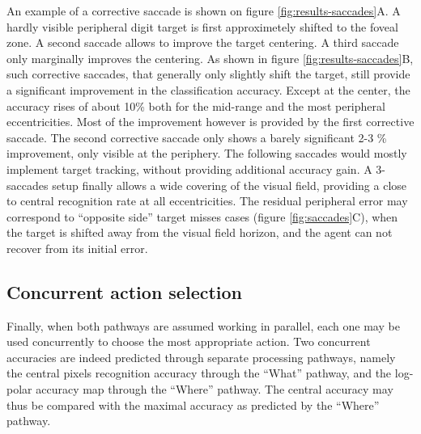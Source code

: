 An example of a corrective saccade is shown on figure \ref{fig:results-saccades}A. A hardly visible peripheral digit target is first approximetely shifted to the foveal zone. A second saccade allows to improve the target centering. A third saccade only marginally improves the centering.
As shown in figure  \ref{fig:results-saccades}B, such corrective saccades, that generally only slightly shift the target, still provide a significant improvement in the classification accuracy. Except at the center, the accuracy rises of about 10\% both for the mid-range and the most peripheral eccentricities. Most of the improvement however is provided by the first corrective saccade. The second corrective saccade only shows a barely significant 2-3 \% improvement, only visible at the periphery. The following saccades would mostly implement target tracking, without providing additional accuracy gain. A 3-saccades setup finally allows a wide covering of the visual field, providing a close to central  recognition rate at all eccentricities. The residual peripheral error may correspond to ``opposite side'' target misses cases (figure \ref{fig:saccades}C), when the target is shifted away from the visual field horizon, and the agent can not recover from its initial error.

\subsection{Concurrent action selection}



Finally, when both pathways are assumed working in parallel, each one may be used concurrently to choose the most appropriate action. Two concurrent accuracies are indeed  predicted through separate processing pathways, namely the central pixels recognition accuracy through the ``What'' pathway, and the log-polar accuracy map through the ``Where'' pathway. The central accuracy may thus be compared with the maximal accuracy as predicted by the ``Where'' pathway.


